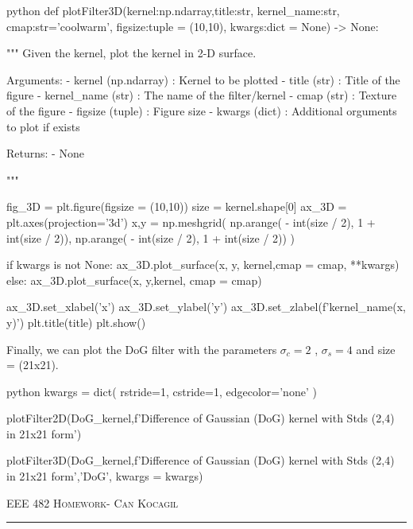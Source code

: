 \documentclass[12pt]{amsart}
\begin{document}
\begin{mintedbox}{python}
def plotFilter3D(kernel:np.ndarray,title:str,
                 kernel_name:str, 
                 cmap:str='coolwarm',
                 figsize:tuple = (10,10),
                 kwargs:dict = None) -> None:

    """
        Given the kernel, plot the kernel in 2-D surface.

            Arguments:
                - kernel (np.ndarray) : Kernel to be plotted
                - title  (str)        : Title of the figure
                - kernel_name (str)   : The name of the filter/kernel
                - cmap   (str)        : Texture of the figure
                - figsize (tuple)     : Figure size
                - kwargs (dict)       : Additional orguments to plot if exists

            Returns:
                - None

    """

    fig_3D = plt.figure(figsize = (10,10))
    size = kernel.shape[0]
    ax_3D = plt.axes(projection='3d')
    x,y = np.meshgrid(
        np.arange( - int(size / 2), 1 + int(size / 2)),
        np.arange( - int(size / 2), 1 + int(size / 2))
                )
    
    if kwargs is not None:
        ax_3D.plot_surface(x, y, kernel,cmap = cmap, **kwargs)
    else:
        ax_3D.plot_surface(x, y,kernel, cmap = cmap)   
    
    ax_3D.set_xlabel('x')
    ax_3D.set_ylabel('y')
    ax_3D.set_zlabel(f'{kernel_name}(x, y)')
    plt.title(title)
    plt.show()
\end{mintedbox}

Finally, we can plot the DoG filter with the parameters $\sigma_c = 2$ , $\sigma_s = 4$ and size = (21x21).

\begin{mintedbox}{python}
kwargs = dict(
    rstride=1,
    cstride=1,     
    edgecolor='none'
)

plotFilter2D(DoG_kernel,f'Difference of Gaussian (DoG) kernel with Stds {(2,4)} in 21x21 form')

plotFilter3D(DoG_kernel,f'Difference of Gaussian (DoG) kernel with Stds {(2,4)} in 21x21 form','DoG', kwargs = kwargs)
\end{mintedbox}



\newpage
{\scshape EEE 482} \hfill {\scshape \large  Homework-\relax} \hfill {\scshape Can Kocagil}
\smallskip
\hrule
\vspace{2mm}
\end{document}
